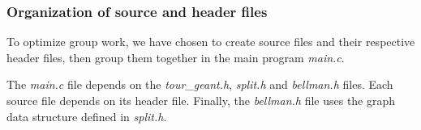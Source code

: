 \subsubsection{Organization of source and header files}

To optimize group work, we have chosen to create source files and their respective header files, then group them together in the main program \textit{main.c}.

The \textit{main.c} file depends on the \textit{tour\_geant.h}, \textit{split.h} and \textit{bellman.h} files. Each source file depends on its header file. Finally, the \textit{bellman.h} file uses the graph data structure defined in \textit{split.h}.
